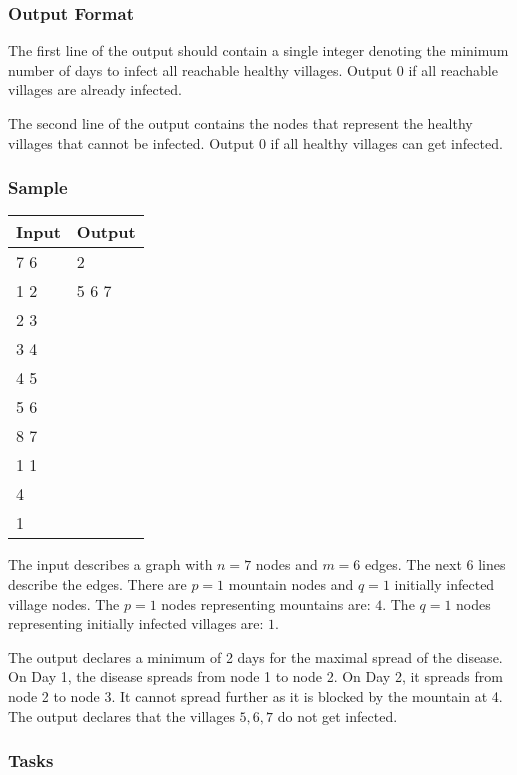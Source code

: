 \documentclass[a4paper]{exam}
\newcommand\heading[1]{\subsubsection*{#1}}
\begin{document}
\begin{questions}
\heading{Output Format}

The first line of the output should contain a single integer denoting the minimum number of days to infect all reachable healthy villages. Output 0 if all reachable villages are already infected.

The second line of the output contains the nodes that represent the healthy villages that cannot be infected. Output 0 if all healthy villages can get infected.

\heading{Sample}
\begin{minipage}{.2\textwidth}
\begin{tabular}{|l|l|}
  \hline
  Input & Output\\\hline
7 6 & 2 \\
1 2 & 5 6 7\\
2 3 & \\
3 4 & \\
4 5 & \\
5 6 & \\
8 7 & \\
1 1 & \\
4 & \\
1 & \\\hline
\end{tabular}
\end{minipage}
\begin{minipage}{.75\textwidth}
The input describes a graph with $n=7$ nodes and $m=6$ edges. The next 6 lines describe the edges. There are $p=1$ mountain nodes and $q=1$ initially infected village nodes. The $p=1$ nodes representing mountains are: $4$. The $q=1$ nodes representing initially infected villages are: $1$.

The output declares a minimum of 2 days for the maximal spread of the disease. On Day 1, the disease spreads from node 1 to node 2. On Day 2, it spreads from node 2 to node 3. It cannot spread further as it is blocked by the mountain at 4. The output declares that the villages $5, 6, 7$ do not get infected.
\end{minipage}

\heading{Tasks}

\begin{parts}

\end{parts}
\end{questions}
\end{document}
